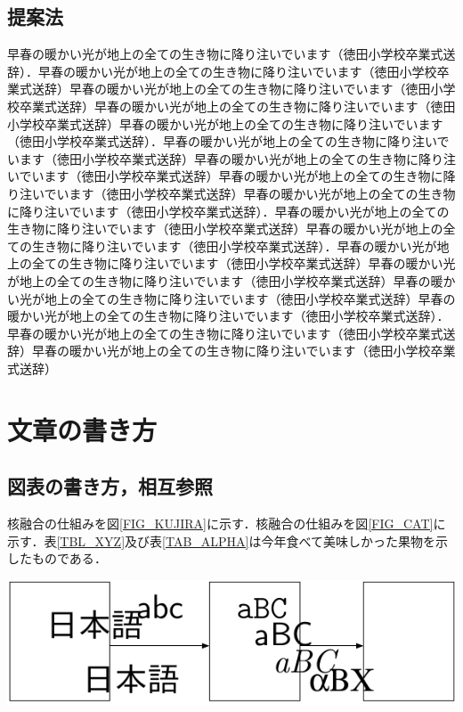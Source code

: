 \begin{multicols*}{2}
\subsection{提案法}
早春の暖かい光が地上の全ての生き物に降り注いでいます（徳田小学校卒業式送辞）．早春の暖かい光が地上の全ての生き物に降り注いでいます（徳田小学校卒業式送辞）早春の暖かい光が地上の全ての生き物に降り注いでいます（徳田小学校卒業式送辞）早春の暖かい光が地上の全ての生き物に降り注いでいます（徳田小学校卒業式送辞）早春の暖かい光が地上の全ての生き物に降り注いでいます（徳田小学校卒業式送辞）．早春の暖かい光が地上の全ての生き物に降り注いでいます（徳田小学校卒業式送辞）早春の暖かい光が地上の全ての生き物に降り注いでいます（徳田小学校卒業式送辞）早春の暖かい光が地上の全ての生き物に降り注いでいます（徳田小学校卒業式送辞）早春の暖かい光が地上の全ての生き物に降り注いでいます（徳田小学校卒業式送辞）．早春の暖かい光が地上の全ての生き物に降り注いでいます（徳田小学校卒業式送辞）早春の暖かい光が地上の全ての生き物に降り注いでいます（徳田小学校卒業式送辞）．早春の暖かい光が地上の全ての生き物に降り注いでいます（徳田小学校卒業式送辞）早春の暖かい光が地上の全ての生き物に降り注いでいます（徳田小学校卒業式送辞）早春の暖かい光が地上の全ての生き物に降り注いでいます（徳田小学校卒業式送辞）早春の暖かい光が地上の全ての生き物に降り注いでいます（徳田小学校卒業式送辞）．早春の暖かい光が地上の全ての生き物に降り注いでいます（徳田小学校卒業式送辞）早春の暖かい光が地上の全ての生き物に降り注いでいます（徳田小学校卒業式送辞）
\section{文章の書き方}
\subsection{図表の書き方，相互参照}
核融合の仕組みを図\ref{FIG_KUJIRA}に示す\cite{jp2k1,bk1}．核融合の仕組みを図\ref{FIG_CAT}に示す．表\ref{TBL_XYZ}及び表\ref{TAB_ALPHA}は今年食べて美味しかった果物を示したものである\cite{sdkguide}．

\begin{Figure} %
	\centering
	\includegraphics[width=\linewidth]{fig/concept.pdf}
	\label{FIG_KUJIRA}
\end{Figure}


\end{multicols*}
